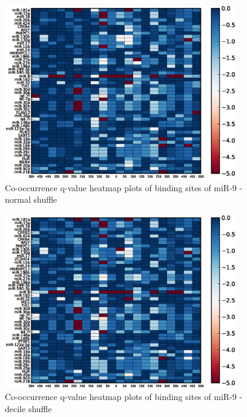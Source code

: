 \begin{figure}
   	\includegraphics[width=0.9\textwidth,clip]{appendix1/figures/miR-9_normal_expressed_heatmap_qvalues0.eps}
   	\caption{Co-occurrence q-value heatmap plots of binding sites of miR-9 - normal shuffle}
\end{figure}
\clearpage
\begin{figure}
   	\includegraphics[width=0.9\textwidth,clip]{appendix1/figures/miR-9_decile_expressed_heatmap_qvalues0.eps}
   	\caption{Co-occurrence q-value heatmap plots of binding sites of miR-9 - decile shuffle}
\end{figure}

